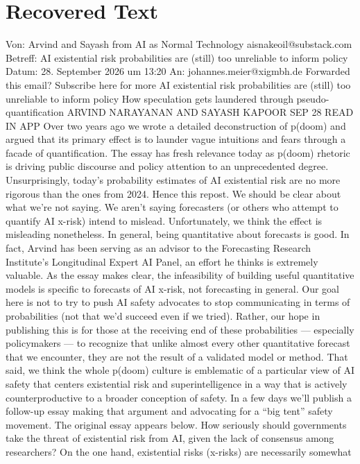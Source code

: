 \section{Recovered Text}
Von: Arvind and Sayash from AI as Normal Technology aisnakeoil@substack.com
Betreff: AI existential risk probabilities are (still) too unreliable to inform policy
Datum: 28. September 2026 um 13:20
An: johannes.meier@xigmbh.de
Forwarded this email? Subscribe here for more
AI existential risk probabilities
are (still) too unreliable to
inform policy
How speculation gets laundered through pseudo-
quantification
ARVIND NARAYANAN AND SAYASH KAPOOR
SEP 28
READ IN APP
Over two years ago we wrote a detailed deconstruction of p(doom)
and argued that its primary effect is to launder vague intuitions and
fears through a facade of quantiﬁcation. The essay has fresh
relevance today as p(doom) rhetoric is driving public discourse and
policy attention to an unprecedented degree. Unsurprisingly, today’s
probability estimates of AI existential risk are no more rigorous than
the ones from 2024. Hence this repost.
We should be clear about what we’re not saying.
We aren’t saying forecasters (or others who attempt to quantify
AI x-risk) intend to mislead. Unfortunately, we think the effect is
misleading nonetheless.
In general, being quantitative about forecasts is good. In fact,
Arvind has been serving as an advisor to the Forecasting
Research Institute’s Longitudinal Expert AI Panel, an effort he
thinks is extremely valuable. As the essay makes clear, the
infeasibility of building useful quantitative models is speciﬁc to
forecasts of AI x-risk, not forecasting in general.
Our goal here is not to try to push AI safety advocates to stop
communicating in terms of probabilities (not that we’d succeed
even if we tried). Rather, our hope in publishing this is for those
at the receiving end of these probabilities — especially
policymakers — to recognize that unlike almost every other
quantitative forecast that we encounter, they are not the result
of a validated model or method.
That said, we think the whole p(doom) culture is emblematic of a
particular view of AI safety that centers existential risk and
superintelligence in a way that is actively counterproductive to a
broader conception of safety. In a few days we’ll publish a follow-up
essay making that argument and advocating for a “big tent” safety
movement.
The original essay appears below.
How seriously should governments take the threat of existential risk
from AI, given the lack of consensus among researchers? On the
one hand, existential risks (x-risks) are necessarily somewhat
